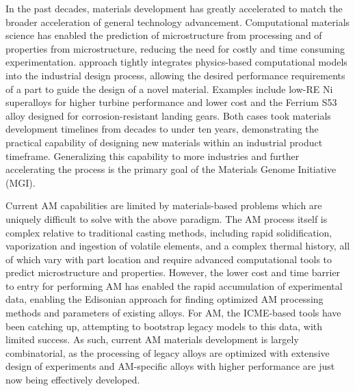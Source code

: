 In the past decades, materials development has greatly accelerated to match the broader acceleration of general technology advancement.
Computational materials science has enabled the prediction of microstructure from processing and of properties from microstructure, reducing the need for costly and time consuming experimentation. 
 approach tightly integrates physics-based computational models into the industrial design process, allowing the desired performance requirements of a part to guide the design of a novel material.
Examples include low-RE Ni superalloys for higher turbine performance and lower cost and the Ferrium S53 alloy designed for corrosion-resistant landing gears.
Both cases took materials development timelines from decades to under ten years, demonstrating the practical capability of designing new materials within an industrial product timeframe.
Generalizing this capability to more industries and further accelerating the process is the primary goal of the Materials Genome Initiative (MGI).


Current AM capabilities are limited by materials-based problems which are uniquely difficult to solve with the above paradigm.
The AM process itself is complex relative to traditional casting methods, including rapid solidification, vaporization and ingestion of volatile elements, and a complex thermal history, all of which vary with part location and require advanced computational tools to  predict microstructure and properties.
However, the lower cost and time barrier to entry for performing AM has enabled the rapid accumulation of experimental data, enabling the Edisonian approach for finding optimized AM processing methods and parameters of existing alloys.
For AM, the ICME-based tools have been catching up, attempting to bootstrap legacy models to this data, with limited success. 
As such, current AM materials development is largely combinatorial, as the processing of legacy alloys are optimized with extensive design of experiments and AM-specific alloys with higher performance are just now being effectively developed.

